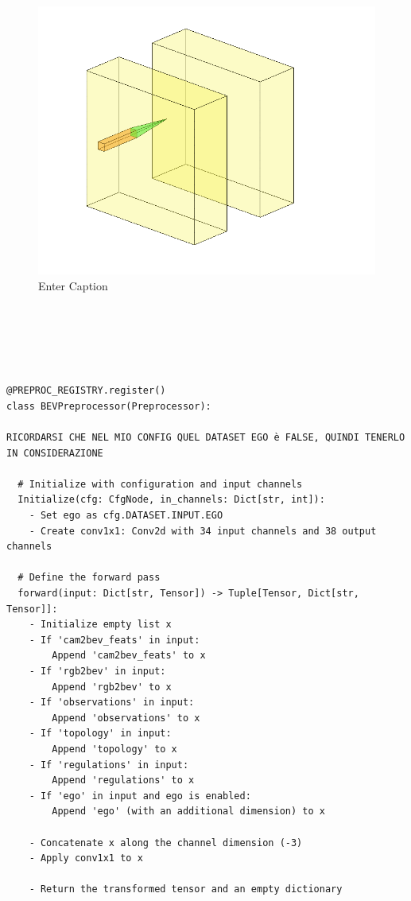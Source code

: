 \begin{figure}
        \centering
        \includegraphics[width=0.75\linewidth]{LateX//figs/download.png}
        \caption{Enter Caption}
        \label{fig:enter-label}
\end{figure}






\begin{verbatim}





@PREPROC_REGISTRY.register()
class BEVPreprocessor(Preprocessor):

RICORDARSI CHE NEL MIO CONFIG QUEL DATASET EGO è FALSE, QUINDI TENERLO IN CONSIDERAZIONE

  # Initialize with configuration and input channels
  Initialize(cfg: CfgNode, in_channels: Dict[str, int]):
    - Set ego as cfg.DATASET.INPUT.EGO
    - Create conv1x1: Conv2d with 34 input channels and 38 output channels

  # Define the forward pass
  forward(input: Dict[str, Tensor]) -> Tuple[Tensor, Dict[str, Tensor]]:
    - Initialize empty list x
    - If 'cam2bev_feats' in input:
        Append 'cam2bev_feats' to x
    - If 'rgb2bev' in input:
        Append 'rgb2bev' to x
    - If 'observations' in input:
        Append 'observations' to x
    - If 'topology' in input:
        Append 'topology' to x
    - If 'regulations' in input:
        Append 'regulations' to x
    - If 'ego' in input and ego is enabled:
        Append 'ego' (with an additional dimension) to x

    - Concatenate x along the channel dimension (-3)
    - Apply conv1x1 to x

    - Return the transformed tensor and an empty dictionary
\end{verbatim}


